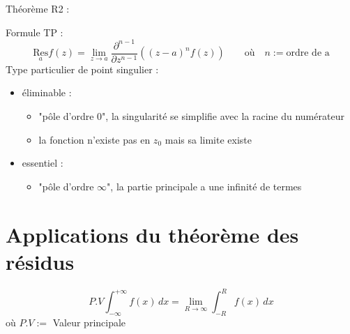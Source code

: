 Théorème R2 : \begin{center}
      \end{center}    
Formule TP :  $$\underset{a}{\text{Res}}f(z)=\lim_{z\rightarrow a}\frac{\partial^{n-1}}{\partial z^{n-1}}((z-a)^nf(z))\qquad\text{où}\quad n:=\text{ordre de a}	 $$
Type particulier de point singulier :\begin{itemize}
\item éliminable :\begin{itemize}
\item "pôle d'ordre 0", la singularité se simplifie avec la racine du numérateur
\item la fonction n'existe pas en $z_0$ mais sa limite existe
\end{itemize}
\item essentiel :\begin{itemize}
\item "pôle d'ordre $\infty$", la partie principale a une infinité de termes
\end{itemize}
\end{itemize}
\section{Applications du théorème des résidus}
 $$ P.V\int_{-\infty}^{+\infty}f(x)\,dx=\lim_{R\rightarrow\infty}\int_{-R}^R f(x)\, dx$$ où $P.V :=$ Valeur principale
